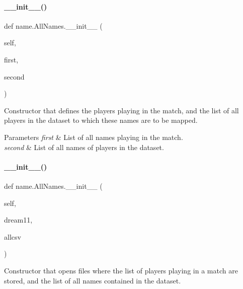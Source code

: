 \paragraph{\texorpdfstring{\+\_\+\+\_\+init\+\_\+\+\_\+()}{\_\_init\_\_()}\hspace{0.1cm}{\footnotesize\ttfamily [1/2]}}
{\footnotesize\ttfamily def name.\+All\+Names.\+\_\+\+\_\+init\+\_\+\+\_\+ (\begin{DoxyParamCaption}\item[{}]{self,  }\item[{}]{first,  }\item[{}]{second }\end{DoxyParamCaption})}



Constructor that defines the players playing in the match, and the list of all players in the dataset to which these names are to be mapped. 


\begin{DoxyParams}{Parameters}
{\em first} & List of all names playing in the match. \\
\hline
{\em second} & List of all names of players in the dataset. \\
\hline
\end{DoxyParams}
\mbox{\label{classname_1_1AllNames_a28c4e3248f60738f445089b1fe8dfe42}} 
\paragraph{\texorpdfstring{\+\_\+\+\_\+init\+\_\+\+\_\+()}{\_\_init\_\_()}\hspace{0.1cm}{\footnotesize\ttfamily [2/2]}}
{\footnotesize\ttfamily def name.\+All\+Names.\+\_\+\+\_\+init\+\_\+\+\_\+ (\begin{DoxyParamCaption}\item[{}]{self,  }\item[{}]{dream11,  }\item[{}]{allcsv }\end{DoxyParamCaption})}



Constructor that opens files where the list of players playing in a match are stored, and the list of all names contained in the dataset. 


